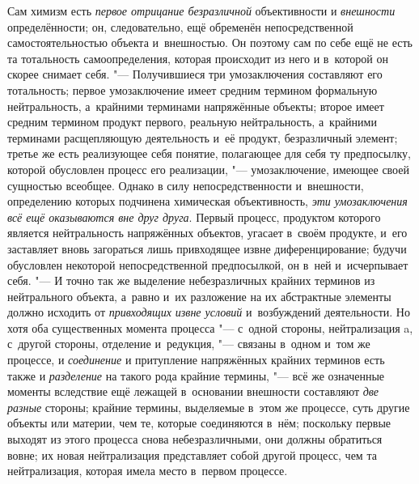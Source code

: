 Сам химизм есть {\em первое
отрицание безразличной} объективности и
{\em внешности}
определённости; он, следовательно, ещё обременён
непосредственной самостоятельностью объекта и~внешностью. Он поэтому сам по
себе ещё не есть та тотальность самоопределения, которая происходит из него
и в~которой он скорее снимает себя. "--- Получившиеся три
умозаключения составляют его тотальность; первое умозаключение имеет
средним термином формальную нейтральность, а~крайними терминами напряжённые
объекты; второе имеет средним термином продукт первого, реальную
нейтральность, а~крайними терминами расщепляющую деятельность и~её продукт,
безразличный элемент; третье же есть реализующее себя понятие, полагающее
для себя ту предпосылку, которой обусловлен процесс его реализации, "---
умозаключение, имеющее своей сущностью всеобщее. Однако в
силу непосредственности и~внешности, определению которых подчинена
химическая объективность, {\em эти
умозаключения всё ещё оказываются вне друг друга}. Первый
процесс, продуктом которого является нейтральность напряжённых объектов,
угасает в~своём продукте, и~его заставляет вновь загораться лишь
привходящее извне диференцирование; будучи обусловлен некоторой
непосредственной предпосылкой, он в~ней и~исчерпывает себя. "---
И точно так же выделение небезразличных крайних терминов из
нейтрального объекта, а~равно и~их разложение на их абстрактные элементы
должно исходить от {\em привходящих
извне условий} и~возбуждений деятельности. Но хотя оба
существенных момента процесса "--- с~одной стороны,
нейтрализация a, с~другой стороны, отделение и~редукция, "---
связаны в~одном и~том же процессе, и
{\em соединение} и
притупление напряжённых крайних терминов есть также и
{\em разделение} на
такого рода крайние термины, "--- всё же означенные моменты
вследствие ещё лежащей в~основании внешности составляют
{\em две разные} стороны;
крайние термины, выделяемые в~этом же процессе, суть другие объекты или
материи, чем те, которые соединяются в~нём; поскольку первые выходят из
этого процесса снова небезразличными, они должны обратиться
вовне; их новая нейтрализация представляет собой другой процесс, чем та
нейтрализация, которая имела место в~первом процессе.

